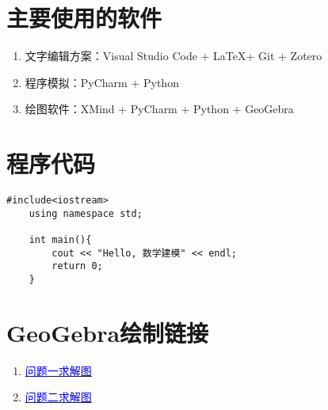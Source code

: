 


\nocite{*}


\appendix
\section{主要使用的软件}

\begin{enumerate}
    \item 文字编辑方案：Visual Studio Code + \LaTeX + Git + Zotero
    \item 程序模拟：PyCharm + Python
    \item 绘图软件：XMind + PyCharm + Python + GeoGebra
\end{enumerate}

\section{程序代码}

\begin{lstlisting}[caption={类的定义语句}]
    #include<iostream>
    using namespace std;

    int main(){
        cout << "Hello, 数学建模" << endl;
        return 0;
    }
\end{lstlisting}

\section{GeoGebra绘制链接}

\begin{enumerate}
    \item \href{https://www.geogebra.org/m/hpkkarys}{\textcolor{blue}{问题一求解图}}
    \item \href{https://www.geogebra.org/m/f6kfjvru}{\textcolor{blue}{问题二求解图}}
\end{enumerate}

